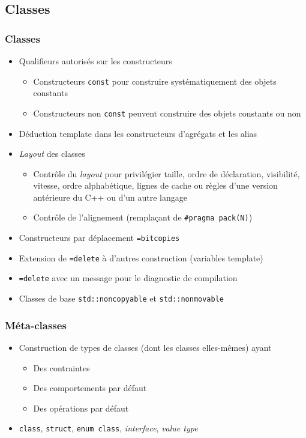 \documentclass[C++.tex]{subfiles}
\begin{document}
\subsection*{Classes}
\begin{frame}[fragile]
	\frametitle{Classes}
	\begin{itemize}
		\item Qualifieurs autorisés sur les constructeurs
		\begin{itemize}
			\item Constructeurs \lstinline|const| pour construire systématiquement des objets constants
			\item Constructeurs non \lstinline|const| peuvent construire des objets constants ou non
		\end{itemize}
		\item Déduction template dans les constructeurs d'agrégats et les alias
		\item \textit{Layout} des classes
		\begin{itemize}
			\item Contrôle du \textit{layout} pour privilégier taille, ordre de déclaration, visibilité, vitesse, ordre alphabétique, lignes de cache ou règles d'une version antérieure du C++ ou d'un autre langage
			\item Contrôle de l'alignement (remplaçant de \lstinline|#pragma pack(N)|)
		\end{itemize}
		\item Constructeurs par déplacement \lstinline|=bitcopies|
		\item Extension de \lstinline|=delete| à d'autres construction (variables template)
		\item \lstinline|=delete| avec un message pour le diagnostic de compilation
		\item Classes de base \lstinline|std::noncopyable| et \lstinline|std::nonmovable|
	\end{itemize}
\end{frame}

\begin{frame}[fragile]
	\frametitle{Méta-classes}
	\begin{itemize}
		\item Construction de types de classes (dont les classes elles-mêmes) ayant
		\begin{itemize}
			\item Des contraintes
			\item Des comportements par défaut
			\item Des opérations par défaut
		\end{itemize}
		\item \lstinline|class|, \lstinline|struct|, \lstinline|enum class|, \textit{interface}, \textit{value type}
	\end{itemize}
\end{frame}
\end{document}
